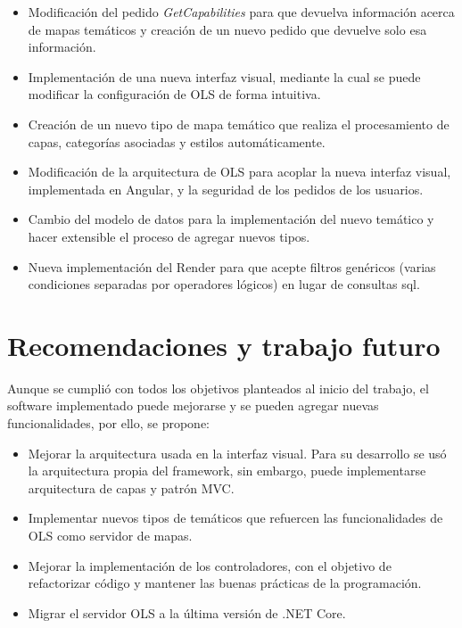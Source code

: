 \begin{itemize}
\item Modificaci\'on del pedido \textit{GetCapabilities} para que devuelva informaci\'on acerca de mapas tem\'aticos y creaci\'on de un nuevo pedido que devuelve solo esa informaci\'on.
\item Implementaci\'on de una nueva interfaz visual, mediante la cual se puede modificar la configuraci\'on de OLS de forma intuitiva.
\item Creaci\'on de un nuevo tipo de mapa tem\'atico que realiza el procesamiento de capas, categor\'ias asociadas y estilos autom\'aticamente.
\item Modificaci\'on de la arquitectura de OLS para acoplar la nueva interfaz visual, implementada en Angular, y la seguridad de los pedidos de los usuarios.
\item Cambio del modelo de datos para la implementaci\'on del nuevo tem\'atico y hacer extensible el proceso de agregar nuevos tipos.
\item Nueva implementaci\'on del Render para que acepte filtros gen\'ericos (varias condiciones separadas por operadores l\'ogicos) en lugar de consultas sql.
\end{itemize}


\section{Recomendaciones y trabajo futuro}
Aunque se cumpli\'o con todos los objetivos planteados al inicio del trabajo, el software implementado puede mejorarse y se pueden agregar nuevas funcionalidades, por ello, se propone:

\begin{itemize}
\item Mejorar la arquitectura usada en la interfaz visual. Para su desarrollo se us\'o la arquitectura propia del framework, sin embargo, puede implementarse arquitectura de capas y patr\'on MVC.
\item Implementar nuevos tipos de tem\'aticos que refuercen las funcionalidades de OLS como servidor de mapas.
\item Mejorar la implementaci\'on de los controladores, con el objetivo de refactorizar c\'odigo y mantener las buenas pr\'acticas de la programaci\'on.
\item Migrar el servidor OLS a la \'ultima versi\'on de .NET Core.
\end{itemize}